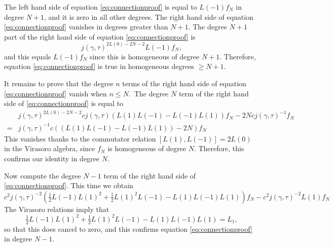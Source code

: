 \documentclass[12pt]{amsart}
\theoremstyle{plain}
\theoremstyle{definition}
\theoremstyle{remark}
\begin{document}
The left hand side of equation \eqref{eq:connectionproof} is equal to $L(-1)f_N$ in degree $N+1$, and it is zero in all other degrees. The right hand side of equation \eqref{eq:connectionproof} vanishes in degrees greater than $N+1$. The degree $N+1$ part of the right hand side of equation \eqref{eq:connectionproof} is
\[
j(\gamma,\tau)^{2L(0)-2N-2}L(-1)f_N,
\]
and this equals $L(-1)f_N$ since this is homogeneous of degree $N+1$. Therefore, equation \eqref{eq:connectionproof} is true in homogeneous degrees $\geq N+1$.

\medskip
It remains to prove that the degree $n$ terms of the right hand side of equation \eqref{eq:connectionproof} vanish when $n \leq N$.\
The degree $N$ term of the right hand side of \eqref{eq:connectionproof} is equal to
\begin{align*}
&j(\gamma,\tau)^{2L(0)-2N-2}cj(\gamma,\tau)(L(1)L(-1)-L(-1)L(1))f_N-2Ncj(\gamma,\tau)^{-1}f_N\\
=&j(\gamma,\tau)^{-1}c((L(1)L(-1)-L(-1)L(1))-2N)f_N
\end{align*}
This vanishes thanks to the commutator relation $[L(1),L(-1)]=  2L(0)$ in the Virasoro algebra, since $f_N$ is homogeneous of degree $N$. Therefore, this confirms our identity in degree $N$.

\medskip
Now compute the degree $N-1$ term of the right hand side of \eqref{eq:connectionproof}. This time we obtain
\[
c^2j(\gamma,\tau)^{-2}(\tfrac 12 L(-1)L(1)^2+\tfrac 12 L(1)^2L(-1)-L(1)L(-1)L(1))f_N-c^2j(\gamma,\tau)^{-2}L(1)f_N
\]
The Virasoro relations imply that
\[\tfrac 12 L(-1)L(1)^2+\tfrac 12 L(1)^2L(-1)-L(1)L(-1)L(1) = L_1,\] 
so that this does cancel to zero, and this confirms equation \eqref{eq:connectionproof} in degree $N-1$.
\end{document}
